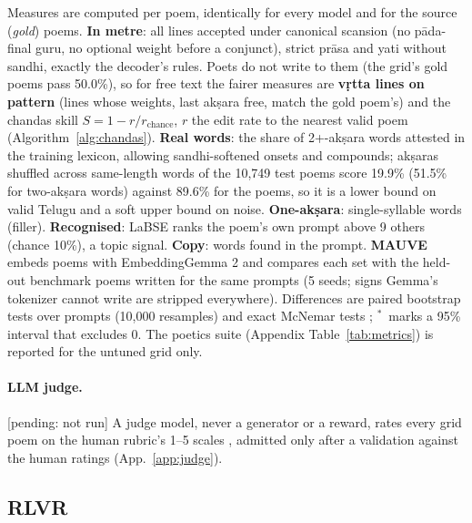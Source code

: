 \documentclass[11pt]{article}
\newcommand{\pend}[1]{\textcolor{pend}{\textsf{\footnotesize[pending: #1]}}}
\newcommand{\sig}{$^{\ast}$}
\begin{document}
Measures are computed per poem, identically for every model and for the source (\emph{gold}) poems.
\textbf{In metre}: all lines accepted under canonical scansion (no pāda-final guru, no optional weight before a
conjunct), strict prāsa and yati without sandhi, exactly the decoder's rules. Poets do not write to them (the
grid's gold poems pass 50.0\%), so for free text the fairer measures are
\textbf{vṛtta lines on pattern} (lines whose weights, last akṣara free, match the gold poem's) and the chandas
skill $S = 1 - r/r_{\mathrm{chance}}$, $r$ the edit rate to the nearest valid poem (Algorithm~\ref{alg:chandas}).
\textbf{Real words}: the share of 2+-akṣara words attested in the training lexicon, allowing sandhi-softened
onsets and compounds; akṣaras shuffled across same-length words of the 10,749 test poems score 19.9\% (51.5\%
for two-akṣara words) against 89.6\% for the poems, so it is a lower bound on valid Telugu and a soft upper
bound on noise. \textbf{One-akṣara}: single-syllable words (filler). \textbf{Recognised}: LaBSE ranks the
poem's own prompt above 9 others (chance 10\%), a topic signal. \textbf{Copy}: words found in the prompt. \textbf{MAUVE} \citep{pillutla2021mauve} embeds poems
with EmbeddingGemma 2 \citep{hf_embeddinggemma2} and compares each set with the held-out benchmark poems
written for the same prompts (5 seeds; signs Gemma's tokenizer cannot write are stripped everywhere). Differences are paired bootstrap tests over prompts
\citep{efron1993bootstrap} (10,000 resamples) and exact McNemar tests \citep{mcnemar1947}; \sig\ marks a 95\%
interval that excludes 0. The poetics suite (Appendix Table~\ref{tab:metrics}) is reported for the untuned
grid only.


\paragraph{LLM judge.} \pend{not run} A judge model, never a generator or a reward, rates every grid poem on the
human rubric's 1--5 scales \citep{zheng2023judge,liu2023geval}, admitted only after a validation against the
human ratings (App.~\ref{app:judge}).

\subsection{RLVR}\label{sec:rlvr-method}
\end{document}
